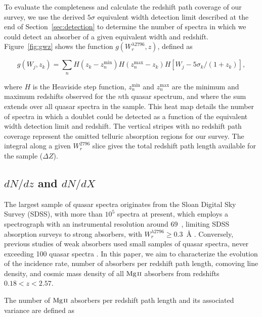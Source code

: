 \documentclass[iop,apj,numberedappendix,appendixfloats,twocolappendix]{emulateapj}
\begin{document}
To evaluate the completeness and calculate the redshift path coverage of our survey, we use the derived $5\sigma$ equivalent width detection limit described at the end of Section~\ref{sec:detection} to determine the number of spectra in which we could detect an absorber of a given equivalent width and redshift. Figure~\ref{fig:gwz} shows the function $g(W_r^{\lambda2796}, z)$, defined as

\begin{equation}
g(W_j,z_k) = \sum_n H(z_k - z_n^{\mathrm{min}}) H(z_n^{\mathrm{max}} - z_k) H[W_j - 5\sigma_k / (1 + z_k)],
\label{eqn:gwz}
\end{equation}

\noindent where $H$ is the Heaviside step function, $z_n^{\mathrm{min}}$ and $z_n^{\mathrm{max}}$ are the minimum and maximum redshifts observed for the $n$th quasar spectrum, and where the sum extends over all quasar spectra in the sample. This heat map details the number of spectra in which a {\MgIIdblt} doublet could be detected as a function of the equivalent width detection limit and redshift. The vertical stripes with no redshift path coverage represent the omitted telluric absorption regions for our survey. The integral along a given $W_r^{2796}$ slice gives the total redshift path length available for the sample ($\Delta Z$).

\subsection{$dN\!/dz$ and $dN\!/dX$}
\label{dndzdndx}

The largest sample of quasar spectra originates from the Sloan Digital Sky Survey (SDSS), with more than $10^5$ spectra at present, which employs a spectrograph with an instrumental resolution around $69$~{\kms}, limiting SDSS absorption surveys to strong absorbers, with $W_r^{\lambda2796} \ge 0.3$~{\AA} \citep{Nestor2005,Zhu2013}. Conversely, previous studies of weak absorbers used small samples of quasar spectra, never exceeding 100 quasar spectra \citep{Steidel1992,Narayanan2007,Kacprzak2011}. In this paper, we aim to characterize the evolution of the incidence rate, number of absorbers per redshift path length, comoving line density, and cosmic mass density of all ${\hbox{{\rm Mg}\kern 0.1em{\sc ii}}}$ absorbers from redshifts $0.18 < z < 2.57$.

The number of ${\hbox{{\rm Mg}\kern 0.1em{\sc ii}}}$ absorbers per redshift path length and its associated variance are defined as
\end{document}
